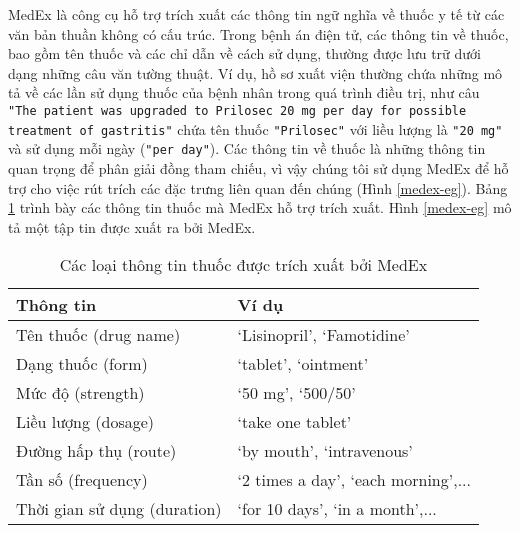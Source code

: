 MedEx là công cụ hỗ trợ trích xuất các thông tin ngữ nghĩa về thuốc y tế từ các văn bản thuần không có cấu trúc. Trong bệnh án điện tử, các thông tin về thuốc, bao gồm tên thuốc và các chỉ dẫn về cách sử dụng, thường được lưu trữ dưới dạng những câu văn tường thuật. Ví dụ, hồ sơ xuất viện thường chứa những mô tả về các lần sử dụng thuốc của bệnh nhân trong quá trình điều trị, như câu \texttt{"The patient was upgraded to Prilosec 20 mg per day for possible treatment of gastritis"} chứa tên thuốc \texttt{"Prilosec"} với liều lượng là \texttt{"20 mg"} và sử dụng mỗi ngày (\texttt{"per day"}). Các thông tin về thuốc là những thông tin quan trọng để phân giải đồng tham chiếu, vì vậy chúng tôi sử dụng MedEx để hỗ trợ cho việc rút trích các đặc trưng liên quan đến chúng (Hình \ref{medex-eg}). Bảng \ref{tab:med-info} trình bày các thông tin thuốc mà MedEx hỗ trợ trích xuất. Hình \ref{medex-eg} mô tả một tập tin được xuất ra bởi MedEx.
%
%

\begin{table}[ht]
\centering{}
\caption{Các loại thông tin thuốc được trích xuất bởi MedEx\label{tab:med-info}}
\footnotesize\sffamily

\begin{tabularx}{0.8\textwidth}{@{}XX@{}}
\toprule
\textbf{Thông tin} & \textbf{Ví dụ}\\
\midrule
Tên thuốc (drug name) & `Lisinopril', `Famotidine'\\
Dạng thuốc (form) & `tablet', `ointment'\\
Mức độ (strength) & `50 mg', `500/50'\\
Liều lượng (dosage) & `take one tablet'\\
Đường hấp thụ (route) & `by mouth', `intravenous'\\
Tần số (frequency) & `2 times a day', `each morning',...\\
Thời gian sử dụng (duration) & `for 10 days', `in a month',...\\
\bottomrule
\end{tabularx}
\end{table}

